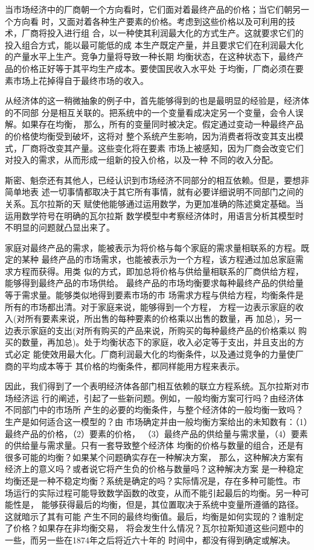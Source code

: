 当市场经济中的厂商朝一个方向看时，它们面对着最终产品的价格；当它们朝另一个方向看
时，又面对着各种生产要素的价格。考虑到这些价格以及可利用的技术，厂商将投入进行组
合，以一种使其利润最大化的方式生产。这就要求它们的投入组合方式，能以最可能低的成
本生产既定产量，并且要求它们在利润最大化的产量水平上生产。竞争力量将导致一种长期
均衡状态，在这种状态下，最终产品的价格正好等于其平均生产成本。要使国民收入水平处
于均衡，厂商必须在要素市场上花掉得自于最终市场的收入。

从经济体的这一稍微抽象的例子中，首先能够得到的也是最明显的经验是，经济体的不同部
分是相互关联的。把系统中的一个变量看成决定另一个变量，会令人误解。如果存在均衡，
那么，所有的变量同时被决定。假定通过变动一种最终产品的价格使均衡受到破坏，这将对
整个系统产生影响，因为消费者将改变其支出模式，厂商将改变其产量。这些变化将在要素
市场上被感知，因为厂商会改变它们对投入的需求，从而形成一组新的投入价格，以及一种
不同的收入分配。

斯密、魁奈还有其他人，已经认识到市场经济不同部分的相互依赖。但是，要想非简单地表
述一切事情都取决于其它所有事情，就有必要详细说明不同部门之间的关系。瓦尔拉斯的天
赋使他能够通过运用数学，为更加准确的陈述奠定基础。当运用数学符号在明确的瓦尔拉斯
数学模型中考察经济体时，用语言分析其模型时不明显的问题就凸显出来了。

家庭对最终产品的需求，能被表示为将价格与每个家庭的需求量相联系的方程。既定的某种
最终产品的市场需求，也能被表示为一个方程，该方程通过加总家庭需求方程而获得。用类
似的方式，即加总将价格与供给量相联系的厂商供给方程，能够得到最终产品的市场供给。
最终产品的市场均衡要求每种最终产品的供给量等于需求量。能够类似地得到要素市场的市
场需求方程与供给方程，均衡条件是所有的市场都出清。对于家庭来说，能够得到一个方程，
方程一边表示家庭的收入(对所有要素来说，所出售的每种要素的价格乘以出售的数量，再
加总)，另一边表示家庭的支出(对所有购买的产品来说，所购买的每种最终产品的价格乘以
购买的数量，再加总)。处于均衡状态下的家庭，收入必定等于支出，并且支出的方式必定
能使效用最大化。厂商利润最大化的均衡条件，以及通过竞争的力量使厂商的平均成本等于
其价格的均衡条件，都同样能用方程来表示。

因此，我们得到了一个表明经济体各部门相互依赖的联立方程系统。瓦尔拉斯对市场经济运
行的阐述，引起了一些新问题。例如，一般均衡方案可行吗？由经济体不同部门中的市场所
产生的必要的均衡条件，与整个经济体的一般均衡一致吗？生产是如何适合这一模型的？由
市场确定并由一般均衡方案给出的未知数有：（1）最终产品的价格，（2）要素的价格，
（3）最终产品的供给量与需求量，（4）要素的供给量与需求量。只有一套导致整个经济体
均衡的价格与数量的组合，还是有很多可能的均衡？如果某个问题确实存在一种解决方案，
那么，这种解决方案有经济上的意义吗？或者说它将产生负的价格与数量吗？这种解决方案
是一种稳定均衡还是一种不稳定均衡？系统是确定的吗？实际情况是，存在多种可能性。市
场运行的实际过程可能导致数学函数的改变，从而不能引起最后的均衡。另一种可能性是，
能够获得最后的均衡，但是，其位置取决于系统中变量所遵循的路径。这就暗示了其有可能
产生不同的最终均衡值。最后，均衡是如何实现的？谁制定了价格？如果存在非均衡交易，
将会发生什么情况？瓦尔拉斯知道这些问题中的一些，而另一些在1874年之后将近六十年的
时间中，都没有得到确定或解决。

